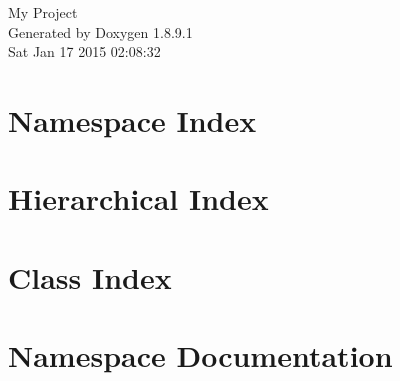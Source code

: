 \documentclass[twoside]{book}
\newcommand{\+}{\discretionary{\mbox{\scriptsize$\hookleftarrow$}}{}{}}
\newcommand{\clearemptydoublepage}{%
  \newpage{\pagestyle{empty}\cleardoublepage}%
}
\begin{document}
\hypersetup{pageanchor=false,
             bookmarks=true,
             bookmarksnumbered=true,
             pdfencoding=unicode
            }
\begin{titlepage}
\vspace*{7cm}
\begin{center}%
{\Large My Project }\\
\vspace*{1cm}
{\large Generated by Doxygen 1.8.9.1}\\
\vspace*{0.5cm}
{\small Sat Jan 17 2015 02:08:32}\\
\end{center}
\end{titlepage}
\clearemptydoublepage
\tableofcontents
\clearemptydoublepage
{}
\hypersetup{pageanchor=true}

\chapter{Namespace Index}

\chapter{Hierarchical Index}

\chapter{Class Index}

\chapter{Namespace Documentation}

\end{document}

